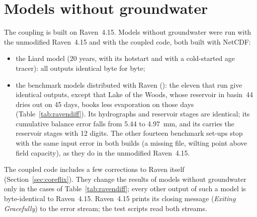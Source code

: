 \section{Models without groundwater}\label{sec:regression}
The coupling is built on Raven~4.15. Models without groundwater were run with the unmodified Raven~4.15 and with the
coupled code, both built with NetCDF:
\begin{itemize}
\item the Liard model (20 years, with its hotstart and with a cold-started age tracer): all outputs identical byte for byte;
\item the benchmark models distributed with Raven (): the eleven that run give identical
      outputs, except that Lake of the Woods, whose reservoir in basin~44 dries out on 45 days, books less evaporation on
      those days (Table~\ref{tab:ravendiff}). Its hydrographs and reservoir stages are identical; its cumulative balance
      error falls from 5.44 to 4.97~mm, and its  carries the reservoir stages with 12 digits. The other
      fourteen benchmark set-ups stop with the same input error in both builds (a missing  file, wilting point
      above field capacity), as they do in the unmodified Raven~4.15.
\end{itemize}
The coupled code includes a few corrections to Raven itself (Section~\ref{sec:coreflix}). They change the results of
models without groundwater only in the cases of Table~\ref{tab:ravendiff}; every other output of such a model is
byte-identical to Raven~4.15. Raven~4.15 prints its closing message (\emph{Exiting Gracefully}) to the error stream; the test
scripts read both streams.

